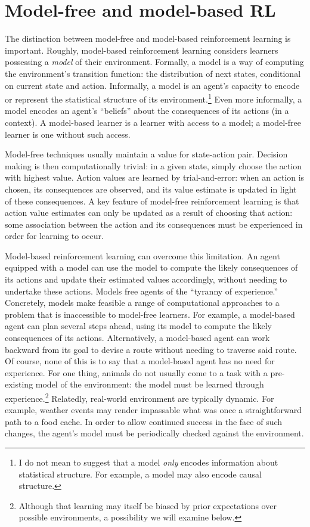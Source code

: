 \section{Model-free and model-based RL}

The distinction between model-free and model-based reinforcement learning is important.
Roughly, model-based reinforcement learning considers learners possessing a \emph{model} of their environment.
Formally, a model is a way of computing the environment's transition function: the distribution of next states, conditional on current state and action.
Informally, a model is an agent's capacity to encode or represent the statistical structure of its environment.\footnote{I do not mean to suggest that a model \emph{only} encodes information about statistical structure. For example, a model may also encode causal structure.}
Even more informally, a model encodes an agent's ``beliefs'' about the consequences of its actions (in a context).
A model-based learner is a learner with access to a model; a model-free learner is one without such access.

Model-free techniques usually maintain a value for state-action pair.
Decision making is then computationally trivial: in a given state, simply choose the action with highest value.
Action values are learned by trial-and-error: when an action is chosen, its consequences are observed, and its value estimate is updated in light of these consequences. 
A key feature of model-free reinforcement learning is that action value estimates can only be updated as a result of choosing that action: some association between the action and its consequences must be experienced in order for learning to occur.

Model-based reinforcement learning can overcome this limitation.
An agent equipped with a model can use the model to compute the likely consequences of its actions and update their estimated values accordingly, without needing to undertake these actions.
Models free agents of the ``tyranny of experience.''
Concretely, models make feasible a range of computational approaches to a problem that is inaccessible to model-free learners.
For example, a model-based agent can plan several steps ahead, using its model to compute the likely consequences of its actions.
Alternatively, a model-based agent can work backward from its goal to devise a route without needing to traverse said route.
Of course, none of this is to say that a model-based agent has no need for experience.
For one thing, animals do not usually come to a task with a pre-existing model of the environment: the model must be learned through experience.\footnote{Although that learning may itself be biased by prior expectations over possible environments, a possibility we will examine below.}
Relatedly, real-world environment are typically dynamic.
For example, weather events may render impassable what was once a straightforward path to a food cache.
In order to allow continued success in the face of such changes, the agent's model must be periodically checked against the environment.

